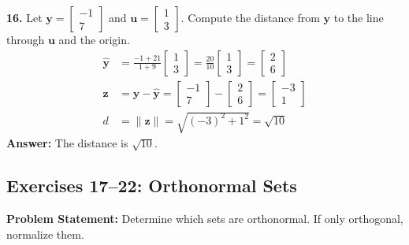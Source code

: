 \documentclass[11pt, letterpaper]{article}
\theoremstyle{definition}
\theoremstyle{remark}
\begin{document}
\textbf{16.} Let $\mathbf{y} = \begin{bmatrix} -1 \\ 7 \end{bmatrix}$ and $\mathbf{u} = \begin{bmatrix} 1 \\ 3 \end{bmatrix}$. Compute the distance from $\mathbf{y}$ to the line through $\mathbf{u}$ and the origin.
\begin{align*}
    \hat{\mathbf{y}} &= \frac{-1 + 21}{1 + 9} \begin{bmatrix} 1 \\ 3 \end{bmatrix} = \frac{20}{10} \begin{bmatrix} 1 \\ 3 \end{bmatrix} = \begin{bmatrix} 2 \\ 6 \end{bmatrix} \\
    \mathbf{z} &= \mathbf{y} - \hat{\mathbf{y}} = \begin{bmatrix} -1 \\ 7 \end{bmatrix} - \begin{bmatrix} 2 \\ 6 \end{bmatrix} = \begin{bmatrix} -3 \\ 1 \end{bmatrix} \\
    d &= \|\mathbf{z}\| = \sqrt{(-3)^2 + 1^2} = \sqrt{10}
\end{align*}
\textbf{Answer:} The distance is $\sqrt{10}$.

\subsection{Exercises 17--22: Orthonormal Sets}
\textbf{Problem Statement:} Determine which sets are orthonormal. If only orthogonal, normalize them.
\end{document}
